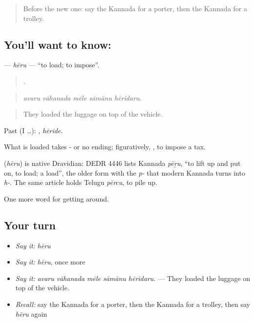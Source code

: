 \begin{quote}
Before the new one: say the Kannada for a porter, then the Kannada for a trolley.
\end{quote}

\subsection*{You'll want to know: }
\textbf{} — \emph{hēru} — \textquotedblleft{}to load; to impose\textquotedblright{}.

\begin{quote}
    .
\end{quote}

\begin{quote}
\emph{avaru vāhanada mēle sāmānu hēridaru.}
\end{quote}

\begin{quote}
They loaded the luggage on top of the vehicle.
\end{quote}

Past (I …): , \emph{hēride}.

What is loaded takes - or no ending; figuratively,  , to impose a tax.

\begin{cousinweb}
\textbf{} (\emph{hēru}) is native Dravidian: DEDR 4446 lists Kannada \emph{pēṟu}, \textquotedblleft{}to lift up and put on, to load; a load\textquotedblright{}, the older form with the \emph{p-} that modern Kannada turns into \emph{h-}. The same article holds Telugu \emph{pērcu}, to pile up.
\end{cousinweb}

\begin{grammarlens}[title={What you've built}]
One more word for getting around.
\end{grammarlens}

\subsection*{Your turn}
\begin{itemize}
\raggedright
  \item \emph{Say it:} \emph{hēru}
  \item \emph{Say it:} \emph{hēru}, once more
  \item \emph{Say it:} \emph{avaru vāhanada mēle sāmānu hēridaru.} — They loaded the luggage on top of the vehicle.
  \item \emph{Recall:} say the Kannada for a porter, then the Kannada for a trolley, then say \emph{hēru} again
\end{itemize}

